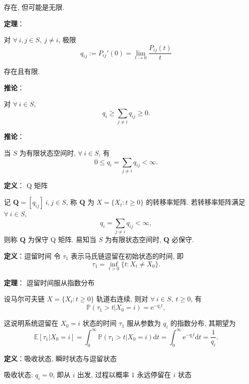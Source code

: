 \documentclass[openany]{ctexbook}
\theoremstyle{kaiti}
\theoremstyle{normal}
\begin{document}
存在, 但可能是无限.

\textbf{定理}：

对 $\forall~i,j\in S,~j\neq i$, 极限
\begin{equation}
  q_{ij}:= P_{ij}'(0)=\lim_{t\to0}\frac{P_{ij}(t)}{t}
\end{equation}

存在且有限.

\textbf{推论}：

对 $\forall~i\in S$,
\begin{equation}
  q_i\geqslant\sum_{j\neq i}q_{ij}\geqslant0.
\end{equation}

\textbf{推论}：

当 $S$ 为有限状态空间时, $\forall~i\in S$, 有
\begin{equation}
  0\leqslant q_i=\sum_{j\neq i}q_{ij}<\infty.
\end{equation}

\textbf{定义}： Q 矩阵

记 $\bm{Q}=[q_{ij}]~i,j\in S$, 称 $\bm{Q}$ 为 $X=\{X_t:t\geqslant0\}$ 的转移率矩阵. 
若转移率矩阵满足 $\forall~i\in S$, 
\begin{equation}
  q_i=\sum_{j\neq i}q_{ij}<\infty,
\end{equation}
则称 $\bm{Q}$ 为保守 Q 矩阵. 易知当 $S$ 为有限状态空间时, $\bm{Q}$ 必保守.

\textbf{定义}：逗留时间
令 $\tau_1$ 表示马氏链逗留在初始状态的时间, 即
\begin{equation}
  \tau_1=\inf_{t>0}\{t:X_t\neq X_0\}.
\end{equation}

\textbf{定理}： 逗留时间服从指数分布

设马尔可夫链 $X=\{X_t:t\geqslant0\}$ 轨道右连续, 则对 $\forall~i\in S,~t\geqslant0$, 有
\begin{equation}
  \mathbb{P}(\tau_1>t|X_0=i)=\mathrm{e}^{-q_it},
\end{equation}

这说明系统逗留在 $X_0=i$ 状态的时间 $\tau_1$ 服从参数为 $q_i$ 的指数分布, 其期望为
\begin{equation}
  \mathbb{E}[\tau_1|X_0=i]=\int_0^\infty \mathbb{P}(\tau_1>t|X_0=i)\mathrm{d}t=\int_0^\infty\mathrm{e}^{-q_it}\mathrm{d}t=\frac{1}{q_i}.
\end{equation}

\textbf{定义}：吸收状态, 瞬时状态与逗留状态

吸收状态: $q_i=0$, 即从 $i$ 出发, 过程以概率 $1$ 永远停留在 $i$ 状态
\end{document}
